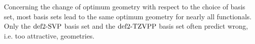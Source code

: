 \documentclass[8.5pt,twoside,twocolumn]{article}
\newcommand\eint{\enmat{E^{\te{int}}}}
\newcommand\kmo{\enmat{\te {kJ/mol}}}
\theoremstyle{standard}
\begin{document}
Concerning the change of optimum geometry with respect to the choice of basis
set, most basis sets lead to the same optimum geometry for nearly all
functionals. Only the $\text{def2-SVP}$ basis set and the $\text{def2-TZVPP}$ basis set often predict
wrong, i.e. too attractive, geometries. 

% 
\end{document}
